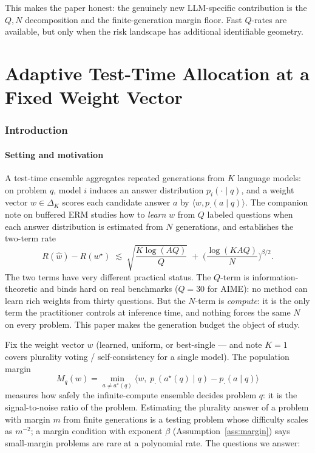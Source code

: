 \documentclass[11pt]{article}
\newcommand{\DeltaK}{\Delta_K}
\newcommand{\what}{\widehat w}
\newcommand{\wstar}{w^\star}
\newcommand{\wfix}{w}
\begin{document}
This makes the paper honest: the genuinely new LLM-specific contribution is the $Q,N$ decomposition and the finite-generation margin floor.  Fast $Q$-rates are available, but only when the risk landscape has additional identifiable geometry.

\part{Adaptive Test-Time Allocation at a Fixed Weight Vector}
\section{Introduction}

\subsection{Setting and motivation}

A test-time ensemble aggregates repeated generations from $K$ language
models: on problem $q$, model $i$ induces an answer distribution
$p_i(\cdot\mid q)$, and a weight vector $\wfix\in\DeltaK$ scores each
candidate answer $a$ by $\langle \wfix,p_\cdot(a\mid q)\rangle$.  The
companion note on buffered ERM studies how to \emph{learn} $\wfix$ from $Q$
labeled questions when each answer distribution is estimated from $N$
generations, and establishes the two-term rate
\[
R(\what)-R(\wstar)
\;\lesssim\;
\sqrt{\frac{K\log(AQ)}{Q}}
\;+\;
\Big(\frac{\log(KAQ)}{N}\Big)^{\beta/2}.
\]
The two terms have very different practical status.  The $Q$-term is
information-theoretic and binds hard on real benchmarks ($Q=30$ for AIME):
no method can learn rich weights from thirty questions.  But the $N$-term is
\emph{compute}: it is the only term the practitioner controls at inference
time, and nothing forces the same $N$ on every problem.  This paper makes
the generation budget the object of study.

Fix the weight vector $\wfix$ (learned, uniform, or best-single --- and note
$K=1$ covers plurality voting / self-consistency for a single model).
The population margin
\[
M_q(\wfix)
=\min_{a\ne a^\star(q)}\big\langle \wfix,\;p_\cdot(a^\star(q)\mid q)-p_\cdot(a\mid q)\big\rangle
\]
measures how safely the infinite-compute ensemble decides problem $q$: it is
the signal-to-noise ratio of the problem.  Estimating the plurality answer
of a problem with margin $m$ from finite generations is a testing problem
whose difficulty scales as $m^{-2}$; a margin condition with exponent
$\beta$ (Assumption~\ref{ass:margin}) says small-margin problems are rare at
a polynomial rate.  The questions we answer:
\end{document}
